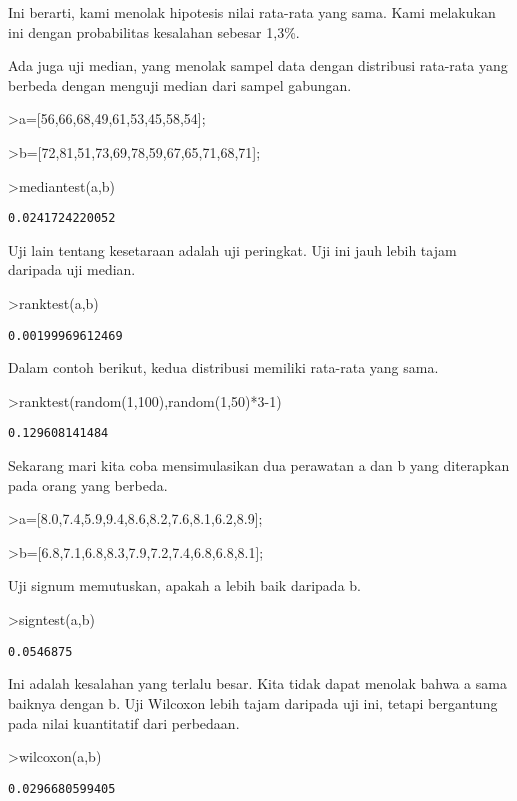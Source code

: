 \documentclass[
]{book}
\begin{document}
Ini berarti, kami menolak hipotesis nilai rata-rata yang sama. Kami melakukan ini dengan probabilitas kesalahan sebesar 1,3\%.

Ada juga uji median, yang menolak sampel data dengan distribusi rata-rata yang berbeda dengan menguji median dari sampel gabungan.

\textgreater a={[}56,66,68,49,61,53,45,58,54{]};

\textgreater b={[}72,81,51,73,69,78,59,67,65,71,68,71{]};

\textgreater mediantest(a,b)

\begin{verbatim}
0.0241724220052
\end{verbatim}

Uji lain tentang kesetaraan adalah uji peringkat. Uji ini jauh lebih tajam daripada uji median.

\textgreater ranktest(a,b)

\begin{verbatim}
0.00199969612469
\end{verbatim}

Dalam contoh berikut, kedua distribusi memiliki rata-rata yang sama.

\textgreater ranktest(random(1,100),random(1,50)*3-1)

\begin{verbatim}
0.129608141484
\end{verbatim}

Sekarang mari kita coba mensimulasikan dua perawatan a dan b yang diterapkan pada orang yang berbeda.

\textgreater a={[}8.0,7.4,5.9,9.4,8.6,8.2,7.6,8.1,6.2,8.9{]};

\textgreater b={[}6.8,7.1,6.8,8.3,7.9,7.2,7.4,6.8,6.8,8.1{]};

Uji signum memutuskan, apakah a lebih baik daripada b.

\textgreater signtest(a,b)

\begin{verbatim}
0.0546875
\end{verbatim}

Ini adalah kesalahan yang terlalu besar. Kita tidak dapat menolak bahwa a sama baiknya dengan b. Uji Wilcoxon lebih tajam daripada uji ini, tetapi bergantung pada nilai kuantitatif dari perbedaan.

\textgreater wilcoxon(a,b)

\begin{verbatim}
0.0296680599405
\end{verbatim}
\end{document}
